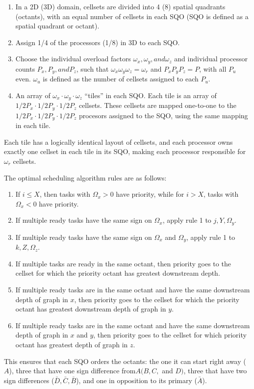 \documentclass[11pt, letterpaper,titlepage,oneside]{article}
\begin{document}
\begin{enumerate}
\item In a 2D (3D) domain, cellsets are divided into 4 (8) spatial quadrants (octants), with an equal number of cellsets in each  SQO (SQO is defined as a spatial quadrant or octant).
\item Assign 1/4 of the processors (1/8) in 3D to each SQO. 
\item Choose the individual overload factors $\omega_x, \omega_y, and \omega_z$ and individual processor counts $P_x, P_y, and P_z$, such that $\omega_x \omega_y \omega_z = \omega_r$ and $P_x P_y P_z = P$, with all $P_u$ even. $\omega_u$ is defined as the number of cellsets assigned to each $P_u$.
\item An array of $\omega_x\cdot\omega_y\cdot\omega_z$ ``tiles'' in each SQO. Each tile is an array of $1/2 P_x \cdot 1/2 P_y \cdot 1/2 P_z$ cellsets. These cellsets are mapped one-to-one to the $1/2 P_x \cdot 1/2 P_y \cdot 1/2 P_z$ procesors assigned to the SQO, using the same mapping in each tile.
\end{enumerate}
Each tile has a logically identical layout of cellsets, and each processor owns exactly one cellset in each tile in its SQO, making each processor responsible for $\omega_r$ cellsets.

The optimal scheduling algorithm rules are as follows:
\begin{enumerate}
\item If $i \leq X$, then tasks with $\Omega_x > 0$ have priority, while for $i > X$, tasks with $\Omega_x < 0$ have priority.
\item If multiple ready tasks have the same sign on $\Omega_x$, apply rule 1 to $j,Y,\Omega_y$.
\item If multiple ready tasks have the same sign on $\Omega_x$ and $\Omega_y$, apply rule 1 to $k,Z, \Omega_z$. 
\item If multiple tasks are ready in the same octant, then priority goes to the cellset for which the priority octant has greatest downstream depth.
\item If multiple ready tasks are in the same octant and have the same downstream depth of graph in $x$, then priority goes to the cellset for which the priority octant has greatest downstream depth of graph in $y$.
\item If multiple ready tasks are in the same octant and have the same downstream depth of graph in $x$ and $y$, then priority goes to the cellset for which priority octant has greatest depth of graph in $z$.
\end{enumerate}
This ensures that each SQO orders the octants: the one it can start right away ($A$), three that have one sign difference from$ A (B,C,$ and $D)$, three that have two sign differences ($\bar D, \bar C, \bar B$), and one in opposition to its primary ($\bar A$).
\end{document}
